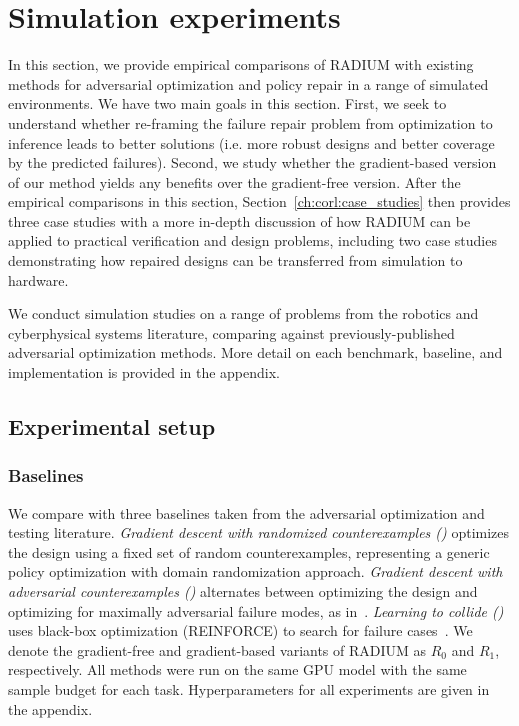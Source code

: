 \section{Simulation experiments}\label{ch:corl:experiments}

In this section, we provide empirical comparisons of RADIUM with existing methods for adversarial optimization and policy repair in a range of simulated environments. We have two main goals in this section. First, we seek to understand whether re-framing the failure repair problem from optimization to inference leads to better solutions (i.e. more robust designs and better coverage by the predicted failures). Second, we study whether the gradient-based version of our method yields any benefits over the gradient-free version. After the empirical comparisons in this section, Section~\ref{ch:corl:case_studies} then provides three case studies with a more in-depth discussion of how RADIUM can be applied to practical verification and design problems, including two case studies demonstrating how repaired designs can be transferred from simulation to hardware.

We conduct simulation studies on a range of problems from the robotics and cyberphysical systems literature, comparing against previously-published adversarial optimization methods. More detail on each benchmark, baseline, and implementation is provided in the appendix.

\subsection{Experimental setup}

\subsubsection{Baselines}

We compare with three baselines taken from the adversarial optimization and testing literature.
%
\textit{Gradient descent with randomized counterexamples (\gdr)} optimizes the design using a fixed set of random counterexamples, representing a generic policy optimization with domain randomization approach.
%
\textit{Gradient descent with adversarial counterexamples (\gda)} alternates between optimizing the design and optimizing for maximally adversarial failure modes, as in~\cite{hanselmannKINGGeneratingSafetyCritical2022a,dawsonRobustCounterexampleguidedOptimization2022b}.
%
\textit{Learning to collide (\ltc)} uses black-box optimization (REINFORCE) to search for failure cases~\cite{dingLearningCollideAdaptive2020a}.
%
We denote the gradient-free and gradient-based variants of RADIUM as $R_0$ and $R_1$, respectively.
%
All methods were run on the same GPU model with the same sample budget for each task. Hyperparameters for all experiments are given in the appendix.

